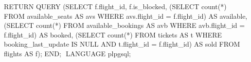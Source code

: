 \documentclass[10pt, a4paper]{article}
\begin{document}
\begin{enumerate}
{\begin{sql}
		RETURN QUERY (SELECT f.flight_id, f.is_blocked,
			(SELECT count(*) FROM available_seats AS avs
				WHERE avs.flight_id = f.flight_id)
			AS available,
			(SELECT count(*) FROM available_bookings AS avb
				WHERE avb.flight_id = f.flight_id)
			AS booked,
			(SELECT count(*) FROM tickets AS t
				WHERE booking_last_update IS NULL
				AND t.flight_id = f.flight_id)
			AS sold
			FROM flights AS f);
	END;
$$ LANGUAGE plpgsql;
	\end{sql}}

\end{enumerate}
\end{document}
